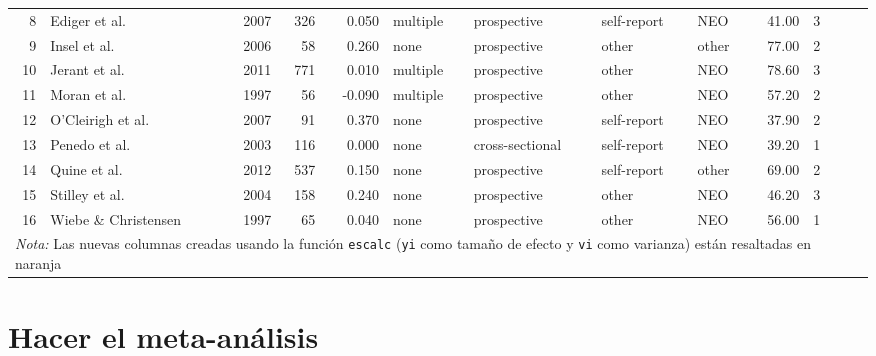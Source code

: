 \documentclass[
  bookmarksnumbered]{article}
\begin{document}
\begin{table}[H]
{\begin{tabular}[t]{rlrrrllllrl>{}r>{}r}
8 & Ediger et al. & 2007 & 326 & 0.050 & multiple & prospective & self-report & NEO & 41.00 & 3 & \cellcolor[HTML]{f68212}{0.0500417} & \cellcolor[HTML]{f68212}{0.0030960}\\
9 & Insel et al. & 2006 & 58 & 0.260 & none & prospective & other & other & 77.00 & 2 & \cellcolor[HTML]{f68212}{0.2661084} & \cellcolor[HTML]{f68212}{0.0181818}\\
10 & Jerant et al. & 2011 & 771 & 0.010 & multiple & prospective & other & NEO & 78.60 & 3 & \cellcolor[HTML]{f68212}{0.0100003} & \cellcolor[HTML]{f68212}{0.0013021}\\
11 & Moran et al. & 1997 & 56 & -0.090 & multiple & prospective & other & NEO & 57.20 & 2 & \cellcolor[HTML]{f68212}{-0.0902442} & \cellcolor[HTML]{f68212}{0.0188679}\\
12 & O'Cleirigh et al. & 2007 & 91 & 0.370 & none & prospective & self-report & NEO & 37.90 & 2 & \cellcolor[HTML]{f68212}{0.3884231} & \cellcolor[HTML]{f68212}{0.0113636}\\
13 & Penedo et al. & 2003 & 116 & 0.000 & none & cross-sectional & self-report & NEO & 39.20 & 1 & \cellcolor[HTML]{f68212}{0.0000000} & \cellcolor[HTML]{f68212}{0.0088496}\\
14 & Quine et al. & 2012 & 537 & 0.150 & none & prospective & self-report & other & 69.00 & 2 & \cellcolor[HTML]{f68212}{0.1511404} & \cellcolor[HTML]{f68212}{0.0018727}\\
15 & Stilley et al. & 2004 & 158 & 0.240 & none & prospective & other & NEO & 46.20 & 3 & \cellcolor[HTML]{f68212}{0.2447741} & \cellcolor[HTML]{f68212}{0.0064516}\\
16 & Wiebe \& Christensen & 1997 & 65 & 0.040 & none & prospective & other & NEO & 56.00 & 1 & \cellcolor[HTML]{f68212}{0.0400214} & \cellcolor[HTML]{f68212}{0.0161290}\\
\bottomrule
\multicolumn{13}{l}{\rule{0pt}{1em}\textit{Nota:} Las nuevas columnas creadas usando la función \texttt{escalc} 
           (\texttt{yi} como tamaño de efecto y \texttt{vi} como varianza) están 
           resaltadas en naranja}\\
\end{tabular}}
\end{table}

\hypertarget{meta-cor}{%
\section{Hacer el meta-análisis}\label{meta-cor}}
\end{document}
